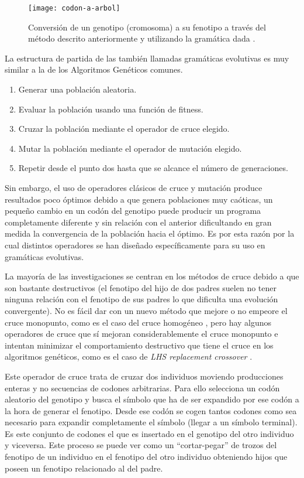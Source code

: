 \begin{figure}[H]
\centering
\texttt{[image: codon-a-arbol]}
\caption{Conversión de un genotipo (cromosoma) a su fenotipo a través del método descrito anteriormente y utilizando la gramática dada \cite{colmenarApuntes}.}
\end{figure}

La estructura de partida de las también llamadas gramáticas evolutivas es muy similar a la de los Algoritmos Genéticos comunes.
\begin{enumerate}
\item Generar una población aleatoria.
\item Evaluar la población usando una función de fitness.
\item Cruzar la población mediante el operador de cruce elegido.
\item Mutar la población mediante el operador de mutación elegido.
\item Repetir desde el punto dos hasta que se alcance el número de generaciones.
\end{enumerate}

Sin embargo, el uso de operadores clásicos de cruce y mutación produce resultados poco óptimos debido a que genera poblaciones muy caóticas, un pequeño cambio en un codón del genotipo puede producir un programa completamente diferente y sin relación con el anterior dificultando en gran medida la convergencia de la población hacia el óptimo. Es por esta razón por la cual distintos operadores se han diseñado específicamente para su uso en gramáticas evolutivas.

La mayoría de las investigaciones se centran en los métodos de cruce debido a que son bastante destructivos (el fenotipo del hijo de dos padres suelen no tener ninguna relación con el fenotipo de sus padres lo que dificulta una evolución convergente). No es fácil dar con un nuevo método que mejore o no empeore el cruce monopunto, como es el caso del cruce homogéneo \cite{O'neill:2003:CGE:608284.608289}, pero hay algunos operadores de cruce que sí mejoran considerablemente el cruce monopunto e intentan minimizar el comportamiento destructivo que tiene el cruce en los algoritmos genéticos, como es el caso de \textit{LHS replacement crossover} \cite{harper2005structure}.

Este operador de cruce trata de cruzar dos individuos moviendo producciones enteras y no secuencias de codones arbitrarias. Para ello selecciona un codón aleatorio del genotipo y busca el símbolo que ha de ser expandido por ese codón a la hora de generar el fenotipo. Desde ese codón se cogen tantos codones como sea necesario para expandir completamente el símbolo (llegar a un símbolo terminal). Es este conjunto de codones el que es insertado en el genotipo del otro individuo y viceversa. Este proceso se puede ver como un ``cortar-pegar'' de trozos del fenotipo de un individuo en el fenotipo del otro individuo obteniendo hijos que poseen un fenotipo relacionado al del padre.

